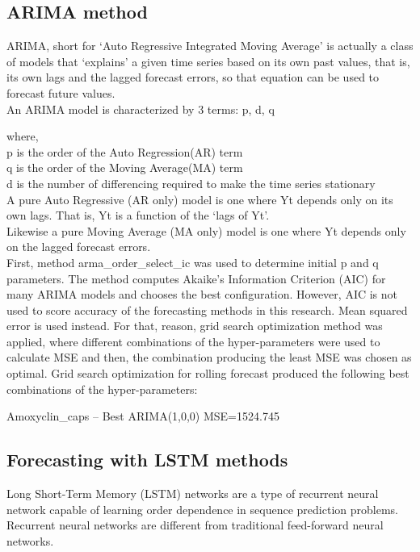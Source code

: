 \documentclass[12pt]{report}
\begin{document}

\subsection{ARIMA  method}

ARIMA, short for ‘Auto Regressive Integrated Moving Average’ is actually a class of models that ‘explains’ a given time series based on its own past values, that is, its own lags and the lagged forecast errors, so that equation can be used to forecast future values.\\

An ARIMA model is characterized by 3 terms: p, d, q

where,\\

p is the order of the Auto Regression(AR) term\\

q is the order of the Moving Average(MA) term\\

d is the number of differencing required to make the time series stationary\\


A pure Auto Regressive (AR only) model is one where Yt depends only on its own lags. That is, Yt is a function of the ‘lags of Yt’.\\

Likewise a pure Moving Average (MA only) model is one where Yt depends only on the lagged forecast errors.\\


 First, method arma\_order\_select\_ic was used to determine initial p and q parameters. The method computes Akaike’s Information Criterion (AIC) for many ARIMA models and chooses the best configuration. However, AIC is not used to score accuracy of the forecasting methods in this research. Mean squared error is used instead. For that, reason, grid search optimization method was applied, where different combinations of the hyper-parameters were used to calculate MSE and then, the combination producing the least MSE was chosen as optimal. Grid search optimization for rolling forecast produced the following best combinations of the hyper-parameters:
 
Amoxyclin\_caps – Best ARIMA(1,0,0) MSE=1524.745


\subsection{Forecasting with LSTM methods}
Long Short-Term Memory (LSTM) networks are a type of recurrent neural network capable of learning order dependence in sequence prediction problems.\\
Recurrent neural networks are different from traditional feed-forward neural networks.
\end{document}
